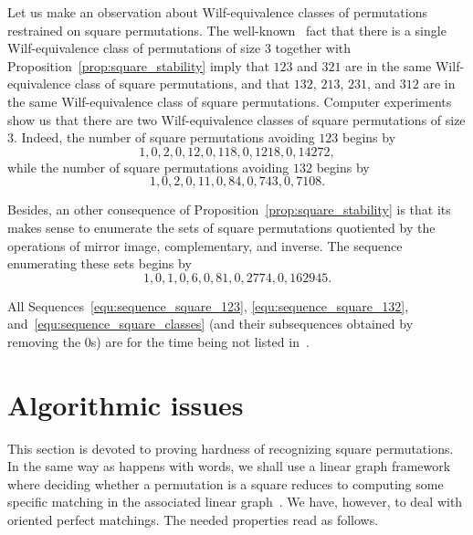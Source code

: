 \documentclass[a4paper]{llncs}
\begin{document}
Let us make an observation about Wilf-equivalence classes of
permutations restrained on square permutations. The
well-known~\cite{Simion:Schmidt:EJC:1985} fact that there is a single
Wilf-equivalence class of permutations of size $3$ together with
Proposition~\ref{prop:square_stability} imply that $123$ and $321$ are
in the same Wilf-equivalence class of square permutations, and that
$132$, $213$, $231$, and $312$ are in the same Wilf-equivalence class of
square permutations. Computer experiments show us that there are two
Wilf-equivalence classes of square permutations of size $3$. Indeed, the
number of square permutations avoiding $123$ begins by
\begin{equation} \label{equ:sequence_square_123}
    1, 0, 2, 0, 12, 0, 118, 0, 1218, 0, 14272,
\end{equation}
while the number of square permutations avoiding $132$ begins by
\begin{equation} \label{equ:sequence_square_132}
    1, 0, 2, 0, 11, 0, 84, 0, 743, 0, 7108.
\end{equation}
\medskip

Besides, an other consequence of Proposition~\ref{prop:square_stability}
is that its makes sense to enumerate the sets of square permutations
quotiented by the operations of mirror image, complementary, and
inverse. The sequence enumerating these sets begins by
\begin{equation} \label{equ:sequence_square_classes}
    1, 0, 1, 0, 6, 0, 81, 0, 2774, 0, 162945.
\end{equation}
\medskip

All Sequences~\eqref{equ:sequence_square_123}, \eqref{equ:sequence_square_132},
and~\eqref{equ:sequence_square_classes} (and their subsequences obtained
by removing the $0$s) are for the time being not listed in~\cite{Slo}.
\medskip


\section{Algorithmic issues}
\label{section:Algorithmic issues}

This section is devoted to proving hardness of recognizing square
permutations. In the same way as happens with words, we shall use a
linear graph framework where deciding whether a permutation is a square
reduces to computing some specific matching in the associated linear
graph~\cite{Buss:Soltys:2014,Rizzi:Vialette:CSR:2013}.
We have, however, to deal with oriented perfect matchings.
The needed properties read as follows.
\end{document}
